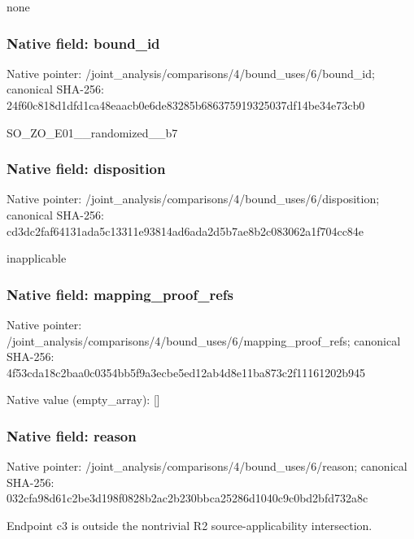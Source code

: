 \documentclass[10pt,a4paper]{article}
\begin{document}
\begingroup\raggedright\sloppy none\par\endgroup

\subsubsection{Native field: bound\_\allowbreak{}id}
Native pointer: /joint\_\allowbreak{}analysis/comparisons/4/bound\_\allowbreak{}uses/6/bound\_\allowbreak{}id; canonical SHA-256: 24f60c818d1dfd1ca48eaacb0e6de83285b686375919325037df14be34e73cb0

\begingroup\raggedright\sloppy SO\_\allowbreak{}ZO\_\allowbreak{}E01\_\allowbreak{}\_\allowbreak{}randomized\_\allowbreak{}\_\allowbreak{}b7\par\endgroup

\subsubsection{Native field: disposition}
Native pointer: /joint\_\allowbreak{}analysis/comparisons/4/bound\_\allowbreak{}uses/6/disposition; canonical SHA-256: cd3dc2faf64131ada5c13311e93814ad6ada2d5b7ae8b2c083062a1f704cc84e

\begingroup\raggedright\sloppy inapplicable\par\endgroup

\subsubsection{Native field: mapping\_\allowbreak{}proof\_\allowbreak{}refs}
Native pointer: /joint\_\allowbreak{}analysis/comparisons/4/bound\_\allowbreak{}uses/6/mapping\_\allowbreak{}proof\_\allowbreak{}refs; canonical SHA-256: 4f53cda18c2baa0c0354bb5f9a3ecbe5ed12ab4d8e11ba873c2f11161202b945

Native value (empty\_\allowbreak{}array): []

\subsubsection{Native field: reason}
Native pointer: /joint\_\allowbreak{}analysis/comparisons/4/bound\_\allowbreak{}uses/6/reason; canonical SHA-256: 032cfa98d61c2be3d198f0828b2ac2b230bbca25286d1040c9c0bd2bfd732a8c

\begingroup\raggedright\sloppy Endpoint c3 is outside the nontrivial R2 source-applicability intersection.\par\endgroup
\end{document}
